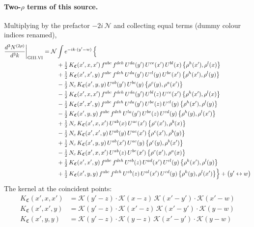 \documentclass[10pt]{article}
\numberwithin{equation}{section}
\newcommand{\KK}{\mathcal K}
\newcommand{\NN}{\mathcal N}
\begin{document}
\paragraph{Two-$\rho$ terms of this source.} Multiplying by the prefactor $-2i\,\NN$ and collecting equal terms (dummy colour indices renamed),
\begin{align}
\frac{d^3N^{(2\rho)}}{d^3k}\bigg|_{\rm GIII.VI}={}&\NN\int e^{-ik\cdot(y'-w)}\,\Big\{\notag\\
&\quad +\tfrac12\,K_{\mathfrak C}(x',x,x')\,f^{abc}\,f^{deh}\,U^{da}(y')\,U^{ce}(x')\,U^{bl}(x)\,\big\{\rho^{h}(x'),\rho^{l}(x)\big\}\notag\\
&\quad +\tfrac12\,K_{\mathfrak C}(x',x',y)\,f^{abc}\,f^{deh}\,U^{da}(y')\,U^{cl}(y)\,U^{be}(x')\,\big\{\rho^{h}(x'),\rho^{l}(y)\big\}\notag\\
&\quad -\tfrac12\,N_{c}\,K_{\mathfrak C}(x',y,y)\,U^{ab}(y')\,U^{bc}(y)\,\big\{\rho^{c}(y),\rho^{a}(x')\big\}\notag\\
&\quad -\tfrac12\,K_{\mathfrak C}(x',x,x')\,f^{abc}\,f^{deh}\,U^{da}(y')\,U^{bl}(z)\,U^{ce}(x')\,\big\{\rho^{h}(x'),\rho^{l}(x)\big\}\notag\\
&\quad -\tfrac12\,K_{\mathfrak C}(x',x',y)\,f^{abc}\,f^{deh}\,U^{da}(y')\,U^{be}(z)\,U^{cl}(y)\,\big\{\rho^{h}(x'),\rho^{l}(y)\big\}\notag\\
&\quad -\tfrac12\,K_{\mathfrak C}(x',y,y)\,f^{abc}\,f^{deh}\,U^{la}(y')\,U^{be}(z)\,U^{cd}(y)\,\big\{\rho^{h}(y),\rho^{l}(x')\big\}\notag\\
&\quad +\tfrac12\,N_{c}\,K_{\mathfrak C}(x',x,x')\,U^{ab}(x)\,U^{ac}(x')\,\big\{\rho^{c}(x'),\rho^{b}(x)\big\}\notag\\
&\quad -\tfrac12\,N_{c}\,K_{\mathfrak C}(x',x',y)\,U^{ab}(y)\,U^{ac}(x')\,\big\{\rho^{c}(x'),\rho^{b}(y)\big\}\notag\\
&\quad +\tfrac12\,N_{c}\,K_{\mathfrak C}(x',y,y)\,U^{ab}(x')\,U^{ac}(y)\,\big\{\rho^{c}(y),\rho^{b}(x')\big\}\notag\\
&\quad -\tfrac12\,N_{c}\,K_{\mathfrak C}(x',x,x')\,U^{ab}(z)\,U^{bc}(x')\,\big\{\rho^{c}(x'),\rho^{a}(x)\big\}\notag\\
&\quad +\tfrac12\,K_{\mathfrak C}(x',x',y)\,f^{abc}\,f^{deh}\,U^{eb}(z)\,U^{ad}(x')\,U^{cl}(y)\,\big\{\rho^{h}(x'),\rho^{l}(y)\big\}\notag\\
&\quad +\tfrac12\,K_{\mathfrak C}(x',y,y)\,f^{abc}\,f^{deh}\,U^{eb}(z)\,U^{al}(x')\,U^{cd}(y)\,\big\{\rho^{h}(y),\rho^{l}(x')\big\}\Big\}+\big(y'\leftrightarrow w\big)\label{eq:res-GIII.VI}
\end{align}
The kernel at the coincident points:
\begin{align*}
K_{\mathfrak C}(x',x,x')&=\KK(y'-z)\cdot\KK(x-z)\,\KK(x'-y')\cdot\KK(x'-w)\\K_{\mathfrak C}(x',x',y)&=\KK(y'-z)\cdot\KK(x'-z)\,\KK(x'-y')\cdot\KK(y-w)\\K_{\mathfrak C}(x',y,y)&=\KK(y'-z)\cdot\KK(y-z)\,\KK(x'-y')\cdot\KK(y-w)
\end{align*}
\end{document}
